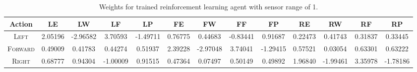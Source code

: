 \documentclass[paper=a4, fontsize=10pt]{scrartcl}
\begin{document}
\begin{table}
\footnotesize
\begin{tabular}{*{13}{c@{\hskip 1.8mm}}}
\toprule
Action & \textsc{LE} & \textsc{LW} & \textsc{LF} & \textsc{LP} & \textsc{FE} & \textsc{FW} & \textsc{FF} & \textsc{FP} & \textsc{RE} & \textsc{RW} & \textsc{RF} & \textsc{RP} \\
\midrule
\textsc{Left} & \textsc{2.05196} & \textsc{-2.96582} & \textsc{3.70593} & \textsc{-1.49711} & \textsc{0.76775} & \textsc{0.44683} & \textsc{-0.83441} & \textsc{0.91687} & \textsc{0.22473} & \textsc{0.41743} & \textsc{0.31837} & \textsc{0.33445} \\
\textsc{Forward} & \textsc{0.49009} & \textsc{0.41783} & \textsc{0.44274} & \textsc{0.51937} & \textsc{2.39228} & \textsc{-2.97048} & \textsc{3.74041} & \textsc{-1.29415} & \textsc{0.57521} & \textsc{0.03054} & \textsc{0.63301} & \textsc{0.63222} \\
\textsc{Right} & \textsc{0.68777} & \textsc{0.94304} & \textsc{-1.00009} & \textsc{0.91515} & \textsc{0.47364} & \textsc{0.07497} & \textsc{0.50149} & \textsc{0.49892} & \textsc{1.96840} & \textsc{-1.99461} & \textsc{3.35978} & \textsc{-1.78186} \\
\bottomrule
\end{tabular}
\caption{Weights for trained reinforcement learning agent with sensor range of 1.}
\label{table:weights}
\end{table}
\end{document}
